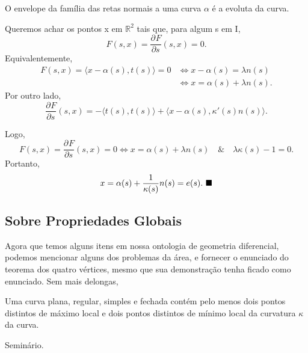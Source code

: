 \documentclass[../differential_geometry.tex]{subfiles}
\begin{document}
\begin{prop*}
	O envelope da família das retas normais a uma curva \(\alpha \) é a evoluta da curva.
\end{prop*}
\begin{proof*}
	Queremos achar os pontos x em \(\mathbb{R}^{2}\) tais que, para algum s em I,
	\[
		F(s, x)=\frac{\partial^{}F}{\partial s^{}}(s, x)=0.
	\]
	Equivalentemente,
	\begin{align*}
		F(s, x)= \langle x-\alpha (s), t(s) \rangle =0 & \Longleftrightarrow x-\alpha (s)=\lambda n(s)    \\
		                                               & \Longleftrightarrow x = \alpha (s)+\lambda n(s).
	\end{align*}
	Por outro lado,
	\[
		\frac{\partial^{}F}{\partial s^{}}(s, x)=-\langle t(s), t(s) \rangle + \langle x-\alpha (s), \kappa '(s)n(s) \rangle.
	\]

	Logo,
	\[
		F(s, x)=\frac{\partial^{}F}{\partial s^{}}(s, x)=0 \Longleftrightarrow x = \alpha (s)+\lambda n(s)\quad\&\quad \lambda \kappa (s)-1=0.
	\]
	Portanto,
	\[
		x = \alpha (s)+\frac{1}{\kappa (s)}n(s) = e(s). \text{ $\blacksquare$}
	\]
\end{proof*}

\subsection{Sobre Propriedades Globais}
Agora que temos alguns itens em nossa ontologia de geometria diferencial, podemos mencionar alguns dos problemas da área, e fornecer o enunciado do teorema dos quatro vértices, mesmo que sua demonstração tenha ficado como enunciado.
Sem mais delongas,
\hypertarget{four_vertices}{
	\begin{theorem*}
		Uma curva plana, regular, simples e fechada contém pelo menos dois pontos distintos de máximo local e dois pontos distintos de mínimo local da curvatura \(\kappa \) da curva.
	\end{theorem*}
}
\begin{proof*}
	Seminário. \qedsymbol
\end{proof*}
\end{document}

